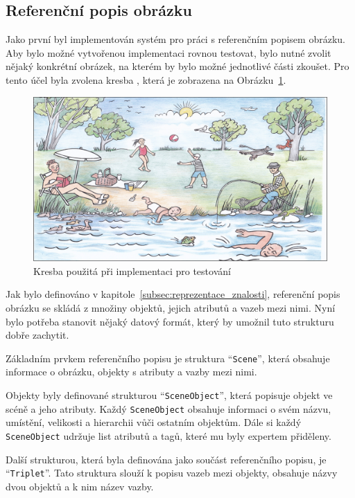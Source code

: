 \subsection{Referenční popis obrázku}
Jako první byl implementován systém pro práci s referenčním popisem obrázku.
Aby bylo možné vytvořenou implementaci rovnou testovat, bylo nutné zvolit nějaký konkrétní obrázek,
na kterém by bylo možné jednotlivé části zkoušet.
Pro tento účel byla zvolena kresba
,
která je zobrazena na Obrázku~\ref{fig:summer}.

\begin{figure}[ht!]
	\centering
	\includegraphics[width=\textwidth]{./src/imgs/summer.png}
	\caption{Kresba použitá při implementaci pro testování}\label{fig:summer}
\end{figure}

Jak bylo definováno v kapitole~\ref{subsec:reprezentace_znalosti}, referenční popis obrázku se skládá z
množiny objektů, jejich atributů a vazeb mezi nimi.
Nyní bylo potřeba stanovit nějaký datový formát, který by umožnil tuto strukturu dobře zachytit.

\newpage
Základním prvkem referenčního popisu je struktura \enquote{\texttt{Scene}}, která obsahuje informace o obrázku, objekty s atributy a vazby mezi nimi.

Objekty byly definované strukturou \enquote{\texttt{SceneObject}}, která popisuje objekt ve scéně a jeho atributy.
Každý \texttt{SceneObject} obsahuje informaci o svém názvu, umístění, velikosti a hierarchii vůči ostatním objektům.
Dále si každý \texttt{SceneObject} udržuje list atributů a tagů, které mu byly expertem přiděleny.

Další strukturou, která byla definována jako součást referenčního popisu, je \enquote{\texttt{Triplet}}.
Tato struktura slouží k popisu vazeb mezi objekty, obsahuje názvy dvou objektů a k nim název vazby.

